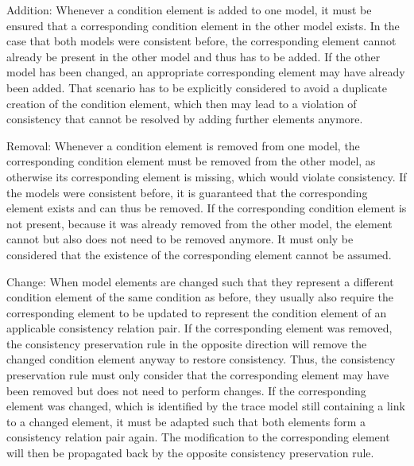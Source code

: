 \begin{properdescription}
    \item[Addition:] Whenever a condition element is added to one model, it must be ensured that a corresponding condition element in the other model exists.
    In the case that both models were consistent before, the corresponding element cannot already be present in the other model and thus has to be added.
    If the other model has been changed, an appropriate corresponding element may have already been added.
    That scenario has to be explicitly considered to avoid a duplicate creation of the condition element, which then may lead to a violation of consistency that cannot be resolved by adding further elements anymore.
    \item[Removal:] Whenever a condition element is removed from one model, the corresponding condition element must be removed from the other model, as otherwise its corresponding element is missing, which would violate consistency.
    If the models were consistent before, it is guaranteed that the corresponding element exists and can thus be removed.
    If the corresponding condition element is not present, because it was already removed from the other model, the element cannot but also does not need to be removed anymore.
    It must only be considered that the existence of the corresponding element cannot be assumed.
    \item[Change:] When model elements are changed such that they represent a different condition element of the same condition as before, they usually also require the corresponding element to be updated to represent the condition element of an applicable consistency relation pair.
    If the corresponding element was removed, the consistency preservation rule in the opposite direction will remove the changed condition element anyway to restore consistency.
    Thus, the consistency preservation rule must only consider that the corresponding element may have been removed but does not need to perform changes.
    If the corresponding element was changed, which is identified by the trace model still containing a link to a changed element, it must be adapted such that both elements form a consistency relation pair again.
    The modification to the corresponding element will then be propagated back by the opposite consistency preservation rule.
\end{properdescription}

